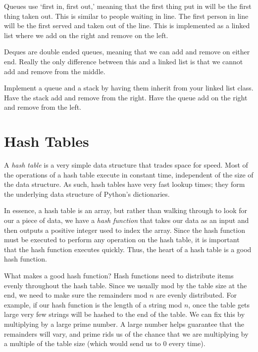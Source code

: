 Queues use `first in, first out,' meaning that the first thing put in will be the first thing taken out.
This is similar to people waiting in line.
The first person in line will be the first served and taken out of the line.
This is implemented as a linked list where we add on the right and remove on the left.

Deques are double ended queues, meaning that we can add and remove on either end.
Really the only difference between this and a linked list is that we cannot add and remove from the middle.

\begin{problem}
Implement a queue and a stack by having them inherit from your linked list class.
Have the stack add and remove from the right.
Have the queue add on the right and remove from the left.
\label{prob:Stack}
\end{problem}

\section*{Hash Tables}
A \emph{hash table} is a very simple data structure that trades space for speed.
Most of the operations of a hash table execute in constant time, independent of the size of the data structure.
As such, hash tables have very fast lookup times; they form the underlying data structure of Python's dictionaries.

In essence, a hash table is an array, but rather than walking through to look for our a piece of data, we have a \emph{hash function} that takes our data as an input and then outputs a positive integer used to index the array.
Since the hash function must be executed to perform any operation on the hash table, it is important that the hash function executes quickly.
Thus, the heart of a hash table is a good hash function.

What makes a good hash function?
Hash functions need to distribute items evenly throughout the hash table.
Since we usually mod by the table size at the end, we need to make sure the remainders mod $n$ are evenly distributed.
For example, if our hash function is the length of a string mod $n$, once the table gets large very few strings will be hashed to the end of the table.
We can fix this by multiplying by a large prime number.
A large number helps guarantee that the remainders will vary, and prime rids us of the chance that we are multiplying by a multiple of the table size (which would send us to 0 every time).

